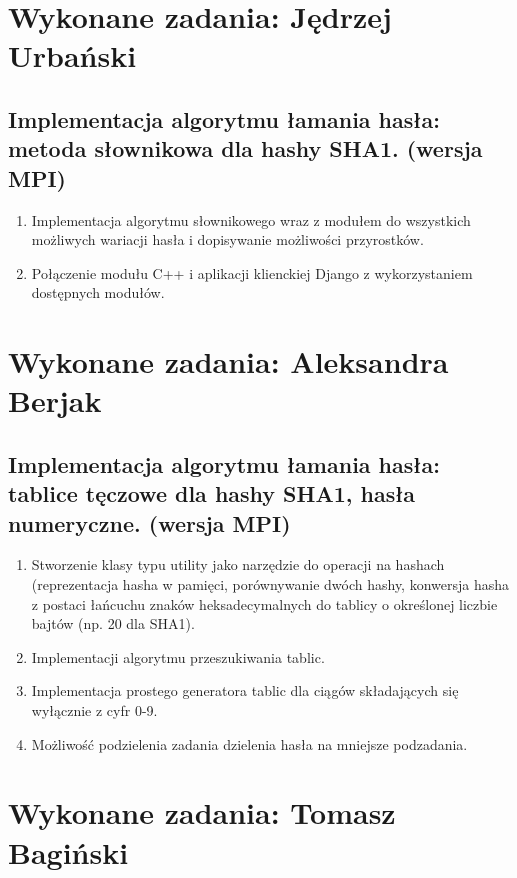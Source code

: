 \documentclass[a4paper,10pt]{article}
\begin{document}
\section{Wykonane zadania: Jędrzej Urbański}

\subsection{Implementacja algorytmu łamania hasła: metoda słownikowa dla hashy SHA1. (wersja MPI)}

\begin{enumerate}
	\item Implementacja algorytmu słownikowego wraz z modułem do wszystkich możliwych wariacji hasła i dopisywanie możliwości przyrostków.
	\item Połączenie modułu C++ i aplikacji klienckiej Django z wykorzystaniem dostępnych modułów.
\end{enumerate}


\section{Wykonane zadania: Aleksandra Berjak}

\subsection{Implementacja algorytmu łamania hasła: tablice tęczowe dla hashy SHA1, hasła numeryczne. (wersja MPI)}

\begin{enumerate}
	\item Stworzenie klasy typu utility jako narzędzie do operacji na hashach (reprezentacja hasha w pamięci, porównywanie dwóch hashy, konwersja hasha z postaci łańcuchu znaków heksadecymalnych do tablicy o określonej liczbie bajtów (np. 20 dla SHA1).
	\item Implementacji algorytmu przeszukiwania tablic.
	\item Implementacja prostego generatora tablic dla ciągów składających się wyłącznie z cyfr 0-9.
	\item Możliwość podzielenia zadania dzielenia hasła na mniejsze podzadania.
\end{enumerate}

\section{Wykonane zadania: Tomasz Bagiński}
\end{document}
